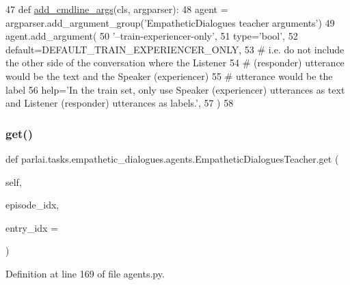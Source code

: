 \begin{DoxyCode}
47     \textcolor{keyword}{def }\hyperlink{namespaceparlai_1_1agents_1_1drqa_1_1config_a62fdd5554f1da6be0cba185271058320}{add\_cmdline\_args}(cls, argparser):
48         agent = argparser.add\_argument\_group(\textcolor{stringliteral}{'EmpatheticDialogues teacher arguments'})
49         agent.add\_argument(
50             \textcolor{stringliteral}{'--train-experiencer-only'},
51             type=\textcolor{stringliteral}{'bool'},
52             default=DEFAULT\_TRAIN\_EXPERIENCER\_ONLY,
53             \textcolor{comment}{# i.e. do not include the other side of the conversation where the Listener}
54             \textcolor{comment}{# (responder) utterance would be the text and the Speaker (experiencer)}
55             \textcolor{comment}{# utterance would be the label}
56             help=\textcolor{stringliteral}{'In the train set, only use Speaker (experiencer) utterances as text and Listener
       (responder) utterances as labels.'},
57         )
58 
\end{DoxyCode}
\mbox{\label{classparlai_1_1tasks_1_1empathetic__dialogues_1_1agents_1_1EmpatheticDialoguesTeacher_a8e8946eba97dbbae2eb7d5d89cf2defb}} 
\subsubsection{\texorpdfstring{get()}{get()}}
{\footnotesize\ttfamily def parlai.\+tasks.\+empathetic\+\_\+dialogues.\+agents.\+Empathetic\+Dialogues\+Teacher.\+get (\begin{DoxyParamCaption}\item[{}]{self,  }\item[{}]{episode\+\_\+idx,  }\item[{}]{entry\+\_\+idx = {} }\end{DoxyParamCaption})}



Definition at line 169 of file agents.\+py.


